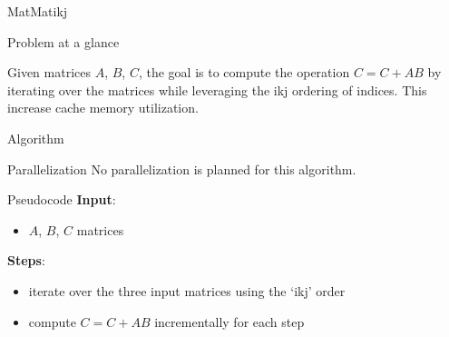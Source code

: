 \begin{chapter}{MatMatikj}
    \begin{section}{Problem at a glance}
        \par Given matrices $A$, $B$, $C$, the goal is to compute the  operation $C = C + AB$ by iterating over the matrices while leveraging the ikj ordering of indices. This increase cache memory utilization.
    \end{section}
    \begin{section}{Algorithm}
        \begin{subsection}{Parallelization}
            No parallelization is planned for this algorithm.
        \end{subsection}
        \begin{subsection}{Pseudocode}
            \textbf{Input}:
            \begin{itemize}
                \item $A$, $B$, $C$ matrices
            \end{itemize}
            \textbf{Steps}:
            \begin{itemize}
                \item iterate over the three input matrices using the `ikj' order
                \item compute $C = C + AB$ incrementally for each step
            \end{itemize}
            
        \end{subsection}
    \end{section}
\end{chapter}